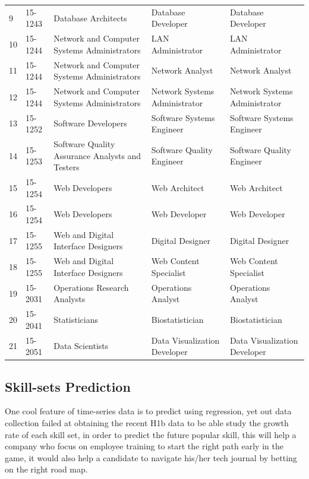 \begin{table}[h!]
{\begin{tabular}{lllll}
			9  &       15-1243 &                              Database Architects &             Database Developer &             Database Developer \\
			10 &       15-1244 &      Network and Computer Systems Administrators &              LAN Administrator &              LAN Administrator \\
			11 &       15-1244 &      Network and Computer Systems Administrators &                Network Analyst &                Network Analyst \\
			12 &       15-1244 &      Network and Computer Systems Administrators &  Network Systems Administrator &  Network Systems Administrator \\
			13 &       15-1252 &                              Software Developers &      Software Systems Engineer &      Software Systems Engineer \\
			14 &       15-1253 &  Software Quality Assurance Analysts and Testers &      Software Quality Engineer &      Software Quality Engineer \\
			15 &       15-1254 &                                   Web Developers &                  Web Architect &                  Web Architect \\
			16 &       15-1254 &                                   Web Developers &                  Web Developer &                  Web Developer \\
			17 &       15-1255 &              Web and Digital Interface Designers &               Digital Designer &               Digital Designer \\
			18 &       15-1255 &              Web and Digital Interface Designers &         Web Content Specialist &         Web Content Specialist \\
			19 &       15-2031 &                     Operations Research Analysts &             Operations Analyst &             Operations Analyst \\
			20 &       15-2041 &                                    Statisticians &                Biostatistician &                Biostatistician \\
			21 &       15-2051 &                                  Data Scientists &   Data Visualization Developer &   Data Visualization Developer \\
			\hline
		\end{tabular}
		
	}
\end{table}
\subsection{Skill-sets Prediction}
One cool feature of time-series data is to predict using regression, yet out data collection failed at obtaining the recent H1b data to be able  study the growth rate of each skill set, in order to predict the future popular skill, this will help a company who focus on employee training to start the right path early in the game, it would also help a candidate to navigate his/her tech journal by betting on the right road map. 
